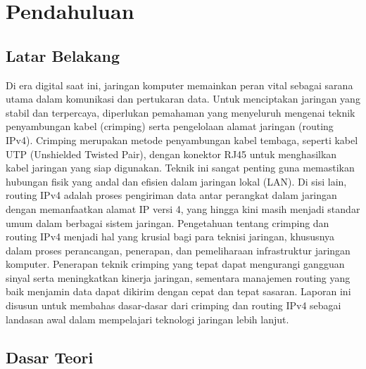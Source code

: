 \section{Pendahuluan}
\subsection{Latar Belakang}
Di era digital saat ini, jaringan komputer memainkan peran vital sebagai sarana utama dalam komunikasi dan pertukaran data. Untuk menciptakan jaringan yang stabil dan terpercaya, diperlukan pemahaman yang menyeluruh mengenai teknik penyambungan kabel (crimping) serta pengelolaan alamat jaringan (routing IPv4). Crimping merupakan metode penyambungan kabel tembaga, seperti kabel UTP (Unshielded Twisted Pair), dengan konektor RJ45 untuk menghasilkan kabel jaringan yang siap digunakan. Teknik ini sangat penting guna memastikan hubungan fisik yang andal dan efisien dalam jaringan lokal (LAN). Di sisi lain, routing IPv4 adalah proses pengiriman data antar perangkat dalam jaringan dengan memanfaatkan alamat IP versi 4, yang hingga kini masih menjadi standar umum dalam berbagai sistem jaringan. Pengetahuan tentang crimping dan routing IPv4 menjadi hal yang krusial bagi para teknisi jaringan, khususnya dalam proses perancangan, penerapan, dan pemeliharaan infrastruktur jaringan komputer. Penerapan teknik crimping yang tepat dapat mengurangi gangguan sinyal serta meningkatkan kinerja jaringan, sementara manajemen routing yang baik menjamin data dapat dikirim dengan cepat dan tepat sasaran. Laporan ini disusun untuk membahas dasar-dasar dari crimping dan routing IPv4 sebagai landasan awal dalam mempelajari teknologi jaringan lebih lanjut.

\subsection{Dasar Teori}
